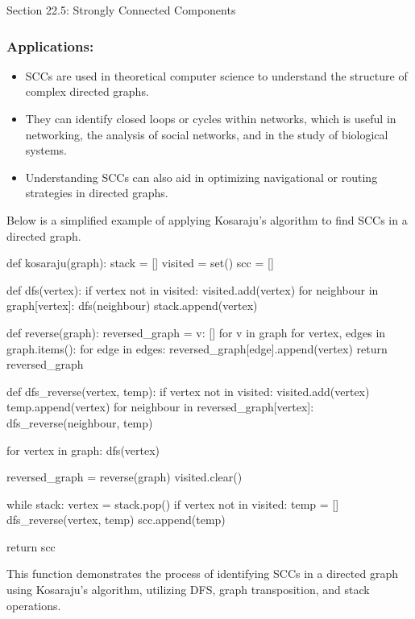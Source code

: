 \begin{notes}{Section 22.5: Strongly Connected Components}
    \subsubsection*{Applications:}

    \begin{itemize}
        \item SCCs are used in theoretical computer science to understand the structure of complex directed graphs.
        \item They can identify closed loops or cycles within networks, which is useful in networking, the analysis of social networks, and in the study of biological systems.
        \item Understanding SCCs can also aid in optimizing navigational or routing strategies in directed graphs.
    \end{itemize}
    
    \begin{highlight}

    Below is a simplified example of applying Kosaraju's algorithm to find SCCs in a directed graph.

    \begin{code}[Python]
    def kosaraju(graph):
        stack = []
        visited = set()
        scc = []
    
        def dfs(vertex):
            if vertex not in visited:
                visited.add(vertex)
                for neighbour in graph[vertex]:
                    dfs(neighbour)
                stack.append(vertex)
    
        def reverse(graph):
            reversed_graph = {v: [] for v in graph}
            for vertex, edges in graph.items():
                for edge in edges:
                    reversed_graph[edge].append(vertex)
            return reversed_graph
    
        def dfs_reverse(vertex, temp):
            if vertex not in visited:
                visited.add(vertex)
                temp.append(vertex)
                for neighbour in reversed_graph[vertex]:
                    dfs_reverse(neighbour, temp)
    
        for vertex in graph:
            dfs(vertex)
    
        reversed_graph = reverse(graph)
        visited.clear()
    
        while stack:
            vertex = stack.pop()
            if vertex not in visited:
                temp = []
                dfs_reverse(vertex, temp)
                scc.append(temp)
    
        return scc
    \end{code}
    This function demonstrates the process of identifying SCCs in a directed graph using Kosaraju's algorithm, utilizing DFS, graph transposition, and stack operations.
    \end{highlight}    
\end{notes}

